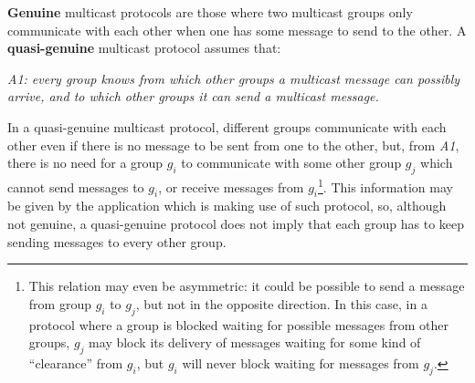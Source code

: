 \documentclass[times, 10pt]{article}
\begin{document}



\textbf{Genuine} multicast protocols are those where two multicast groups only communicate with each other when one has some message to send to the other. A \textbf{quasi-genuine} multicast protocol assumes that: 

\begin{center}
\emph{A1: every group knows from which other groups a multicast message can possibly arrive, and to which other groups it can send a multicast message.}
\end{center}

In a quasi-genuine multicast protocol, different groups communicate with each other even if there is no message to be sent from one to the other, but, from \emph{A1}, there is no need for a group $g_i$ to communicate with some other group $g_j$ which cannot send messages to $g_i$, or receive messages from $g_i$\footnote{This relation may even be asymmetric: it could be possible to send a message from group $g_i$ to $g_j$, but not in the opposite direction. In this case, in a protocol where a group is blocked waiting for possible messages from other groups, $g_j$ may block its delivery of messages waiting for some kind of ``clearance'' from $g_i$, but $g_i$ will never block waiting for messages from $g_j$.}. This information may be given by the application which is making use of such protocol, so, although not genuine, a quasi-genuine protocol does not imply that each group has to keep sending messages to every other group.
\end{document}
